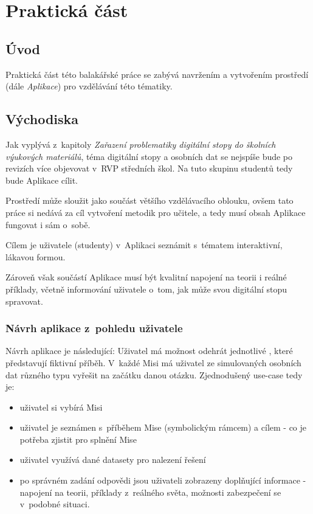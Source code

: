 \chapter{Praktická část}

\section*{Úvod}
Praktická část této balakářské práce se zabývá navržením a vytvořením prostředí (dále \textit{Aplikace}) pro vzdělávání této tématiky.

\section{Východiska}
Jak vyplývá z~kapitoly \textit{Zařazení problematiky digitální stopy do školních výukových materiálů}, téma digitální stopy a osobních dat se nejspíše bude po revizích více objevovat v~RVP středních škol. Na tuto skupinu studentů tedy bude Aplikace cílit.

Prostředí může sloužit jako součást většího vzdělávacího oblouku, ovšem tato práce si nedává za cíl vytvoření metodik pro učitele, a tedy musí obsah Aplikace fungovat i sám o~sobě.

Cílem je uživatele (studenty) v~Aplikaci seznámit s~tématem interaktivní, lákavou formou.

Zároveň však součástí Aplikace musí být kvalitní napojení na teorii i reálné příklady, včetně informování uživatele o~tom, jak může svou digitální stopu spravovat.

\subsection{Návrh aplikace z~pohledu uživatele}
Návrh aplikace je následující:
Uživatel má možnost odehrát jednotlivé , které představují fiktivní příběh. V~každé Misi má uživatel ze simulovaných osobních dat různého typu vyřešit na začátku danou otázku.
Zjednodušený use-case tedy je:
\begin{itemize}
	\item uživatel si vybírá Misi
	\item uživatel je seznámen s~příběhem Mise (symbolickým rámcem) a cílem - co je potřeba zjistit pro splnění Mise
	\item uživatel využívá dané datasety pro nalezení řešení
	\item po správném zadání odpovědi jsou uživateli zobrazeny doplňující informace - napojení na teorii, příklady z~reálného světa, možnosti zabezpečení se v~podobné situaci.
\end{itemize}

